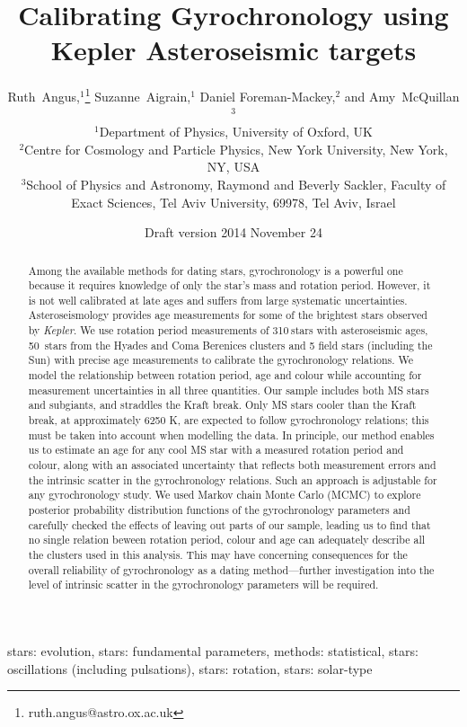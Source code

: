 \documentclass[useAMS, usenatbib]{mn2e}
\title{Calibrating Gyrochronology using Kepler Asteroseismic targets}
\author[R.~Angus \emph{et al.}]{%
    Ruth~Angus,$^1$\thanks{ruth.angus@astro.ox.ac.uk}
    Suzanne~Aigrain,$^1$
    Daniel Foreman-Mackey,$^2$ and
    Amy~McQuillan$^3$ \\
    $^1$Department of Physics, University of Oxford, UK \\
    $^2$Centre for Cosmology and Particle Physics, New York University, New York, NY, USA \\
    $^3$School of Physics and Astronomy, Raymond and Beverly Sackler, Faculty of Exact Sciences, Tel Aviv University, 69978, Tel Aviv, Israel}
\newcommand{\nastero}{310}
\newcommand{\nHC}{50~}
\begin{document}
\date{Draft version 2014 November 24}
\maketitle

\begin{abstract}

Among the available methods for dating stars, gyrochronology is a powerful one
because it requires knowledge of only the star's mass and rotation period.
However, it is not well calibrated at late ages and suffers from large
systematic uncertainties.
Asteroseismology provides age measurements for some of the brightest stars
observed by {\it Kepler}.
We use rotation period measurements of \nastero$~$stars with asteroseismic
ages, \nHC stars from the Hyades and Coma Berenices clusters and 5 field stars
(including the Sun) with precise age measurements to calibrate the
gyrochronology relations.
We model the relationship between rotation period, age and colour while
accounting for measurement uncertainties in all three quantities.
Our sample includes both MS stars and subgiants, and straddles the Kraft break.
Only MS stars cooler than the Kraft break, at approximately 6250 K, are
expected to follow gyrochronology relations; this must be taken into account
when modelling the data.
In principle, our method enables us to estimate an age for any cool MS star
with a measured rotation period and colour, along with an associated
uncertainty that reflects both measurement errors and the intrinsic scatter in
the gyrochronology relations.
Such an approach is adjustable for any gyrochronology study.
We used Markov chain Monte Carlo (MCMC) to explore posterior probability
distribution functions of the gyrochronology parameters and carefully checked
the effects of leaving out parts of our sample, leading us to find that no
single relation beween rotation period, colour and age can adequately describe
all the clusters used in this analysis.
This may have concerning consequences for the overall reliability of
gyrochronology as a dating method---further investigation into the level of
intrinsic scatter in the gyrochronology parameters will be required.

\end{abstract}

\begin{keywords}
stars: evolution, stars: fundamental parameters, methods: statistical, stars:
oscillations (including pulsations), stars: rotation, stars: solar-type
\end{keywords}
\end{document}
